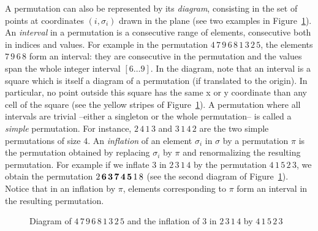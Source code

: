 \documentclass[11pt]{article}
\newcounter{indice}
\begin{document}
A permutation can also be represented by its
{\it diagram}, consisting in the set of points at coordinates $(i,\sigma_i)$ drawn in the plane
(see two examples in Figure~\ref{fig:graphicalRepresentation}).
An {\em interval} in a permutation is a consecutive range of elements, consecutive both in indices and values. 
For example in the permutation $4\,7\,9\,6\,8\,1\,3\,2\,5$, the elements $7\,9\,6\,8$ form an interval: 
they are consecutive in the permutation and the values span the whole integer interval $[6\ldots 9]$. 
In the diagram, note that an interval is a square
which is itself a diagram of a permutation (if translated to the origin).
In particular, no point outside this square has the same x or y coordinate than any cell of the square
(see the yellow stripes of Figure~\ref{fig:graphicalRepresentation}).
A permutation where all intervals are trivial --either a singleton or the whole permutation-- is called a {\em simple} permutation. 
For instance, $2\,4\,1\,3$ and $3\,1\,4\,2$ are the two simple permutations of size $4$.
An {\em inflation} of an element $\sigma_i$ in $\sigma$ by a permutation $\pi$ is the permutation obtained 
by replacing $\sigma_i$ by $\pi$ and renormalizing the resulting permutation. 
For example if we inflate $3$ in $2\,3\,1\,4$ by the permutation $4\,1\,5\,2\,3$, 
we obtain the permutation $2\,{\bf 6\,3\,7\,4\,5}\,1\,8$
(see the second diagram of Figure~\ref{fig:graphicalRepresentation}).
Notice that in an inflation by $\pi$, elements corresponding to $\pi$ form an interval in the resulting permutation.

\begin{figure}[H]
\begin{center}
\caption{Diagram of $4\,7\,9\,6\,8\,1\,3\,2\,5$ and the inflation of $3$ in $2\,3\,1\,4$ by $4\,1\,5\,2\,3$
\label{fig:graphicalRepresentation}}
\end{center}
\end{figure}
\end{document}
